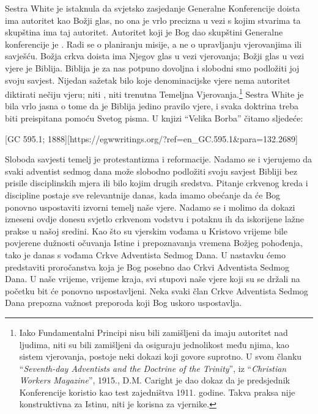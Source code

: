 Sestra White je istaknula da svjetsko zasjedanje Generalne Konferencije doista ima autoritet kao Božji glas, no ona je vrlo precizna u vezi s kojim stvarima ta skupština ima taj autoritet. Autoritet koji je Bog dao skupštini Generalne konferencije je . Radi se o planiranju misije, a ne o upravljanju vjerovanjima ili savješću. Božja crkva doista ima Njegov glas u vezi vjerovanja; Božji glas u vezi vjere je Biblija. Biblija je za nas potpuno dovoljna i slobodni smo podložiti joj svoju savjest. Nijedan sažetak bilo koje denominacijske vjere nema autoritet diktirati nečiju vjeru; niti , niti trenutna Temeljna Vjerovanja.\footnote{Iako Fundamentalni Principi nisu bili zamišljeni da imaju autoritet nad ljudima, niti su bili zamišljeni da osiguraju jednolikost među njima, kao sistem vjerovanja, postoje neki dokazi koji govore suprotno. U svom članku “\textit{Seventh-day Adventists and the Doctrine of the Trinity}”, iz “\textit{Christian Workers Magazine}”, 1915., D.M. Caright je dao dokaz da je predsjednik Konferencije koristio  kao test zajedništva 1911. godine. Takva praksa nije konstruktivna za Istinu, niti je korisna za vjernike.} Sestra White je bila vrlo jasna o tome da je Biblija jedino pravilo vjere, i svaka doktrina treba biti preispitana pomoću Svetog pisma. U knjizi “Velika Borba” čitamo sljedeće:

[GC 595.1; 1888][https://egwwritings.org/?ref=en\_GC.595.1&para=132.2689]

Sloboda savjesti temelj je protestantizma i reformacije. Nadamo se i vjerujemo da svaki adventist sedmog dana može slobodno podložiti svoju savjest Bibliji bez prisile disciplinskih mjera ili bilo kojim drugih sredstva. Pitanje crkvenog kreda i discipline postaje sve relevantnije danas, kada imamo obećanje da će Bog ponovno uspostaviti izvorni temelj naše vjere. Nadamo se i molimo da dokazi izneseni ovdje donesu svjetlo crkvenom vodstvu i potaknu ih da iskorijene lažne prakse u našoj sredini. Kao što su vjerskim vođama u Kristovo vrijeme bile povjerene dužnosti očuvanja Istine i prepoznavanja vremena Božjeg pohođenja, tako je danas s vođama Crkve Adventista Sedmog Dana. U nastavku ćemo predstaviti proročanstva koja je Bog posebno dao Crkvi Adventista Sedmog Dana. U naše vrijeme, vrijeme kraja, svi stupovi naše vjere koji su se držali na početku bit će ponovno uspostavljeni. Neka svaki član Crkve Adventista Sedmog Dana prepozna važnost preporoda koji Bog uskoro uspostavlja.
